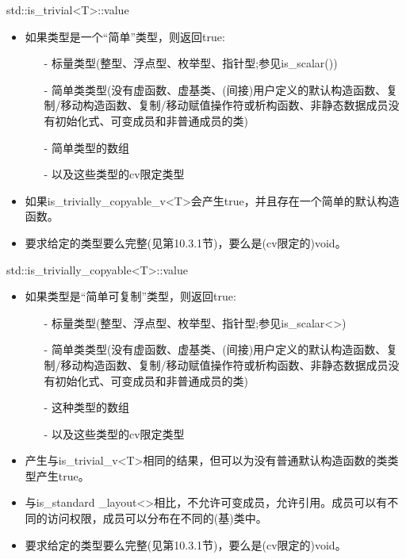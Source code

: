 std::is\_trivial<T>::value

\begin{itemize}
\item 
如果类型是一个“简单”类型，则返回true:

\begin{itemize}
\item [-]
标量类型(整型、浮点型、枚举型、指针型;参见is\_scalar())

\item [-]
简单类类型(没有虚函数、虚基类、(间接)用户定义的默认构造函数、复制/移动构造函数、复制/移动赋值操作符或析构函数、非静态数据成员没有初始化式、可变成员和非普通成员的类)

\item [-]
简单类型的数组

\item [-]
以及这些类型的cv限定类型
\end{itemize}

\item 
如果is\_trivially\_copyable\_v<T>会产生true，并且存在一个简单的默认构造函数。

\item 
要求给定的类型要么完整(见第10.3.1节)，要么是(cv限定的)void。
\end{itemize}

std::is\_trivially\_copyable<T>::value

\begin{itemize}
\item 
如果类型是“简单可复制”类型，则返回true:

\begin{itemize}
\item [-]
标量类型(整型、浮点型、枚举型、指针型;参见is\_scalar<>)

\item [-]
简单类类型(没有虚函数、虚基类、(间接)用户定义的默认构造函数、复制/移动构造函数、复制/移动赋值操作符或析构函数、非静态数据成员没有初始化式、可变成员和非普通成员的类)

\item [-]
这种类型的数组

\item [-]
以及这些类型的cv限定类型
\end{itemize}

\item 
产生与is\_trivial\_v<T>相同的结果，但可以为没有普通默认构造函数的类类型产生true。

\item 
与is\_standard \_layout<>相比，不允许可变成员，允许引用。成员可以有不同的访问权限，成员可以分布在不同的(基)类中。

\item 
要求给定的类型要么完整(见第10.3.1节)，要么是(cv限定的)void。
\end{itemize}

